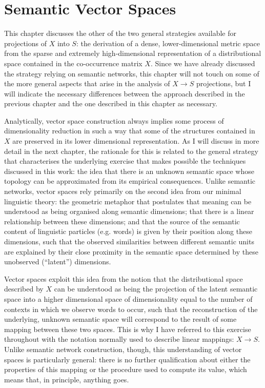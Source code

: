\chapter{Semantic Vector Spaces}
\label{chap:wspaces}

This chapter discusses the other of the two general strategies available for projections of $X $ into $S$: the derivation of a dense, lower-dimensional metric space from the sparse and extremely high-dimensional representation of a distributional space contained in the co-occurrence matrix $X$.
Since we have already discussed the strategy relying on semantic networks, this chapter will not touch on some of the more general aspects that arise in the analysis of $X \rightarrow S$ projections, but I will indicate the necessary differences between the approach described in the previous chapter and the one described in this chapter as necessary.

Analytically, vector space construction always implies some process of dimensionality reduction in such a way that some of the structures contained in $X$ are preserved in its lower dimensional representation.
As I will discuss in more detail in the next chapter, the rationale for this is related to the general strategy that characterises the underlying exercise that makes possible the techniques discussed in this work: the idea that there is an unknown semantic space whose topology can be approximated from its empirical consequences.
Unlike semantic networks, vector spaces rely primarily on the second idea from our minimal linguistic theory: the geometric metaphor that postulates that meaning can be understood as being organised along semantic dimensions; that there is a linear relationship between these dimensions; and that the source of the semantic content of linguistic particles (e.g. words) is given by their position along these dimensions, such that the observed similarities between different semantic units are explained by their close proximity in the semantic space determined by these unobserved (``latent'') dimensions.

Vector spaces exploit this idea from the notion that the distributional space described by $X$ can be understood as being the projection of the latent semantic space into a higher dimensional space of dimensionality equal to the number of contexts in which we observe words to occur, such that the reconstruction of the underlying, unknown semantic space will correspond to the result of some mapping between these two spaces.
This is why I have referred to this exercise throughout with the notation normally used to describe linear mappings: $X \rightarrow S$.
Unlike semantic network construction, though, this understanding of vector spaces is particularly general: there is no further qualification about either the properties of this mapping or the procedure used to compute its value, which means that, in principle, anything goes.

